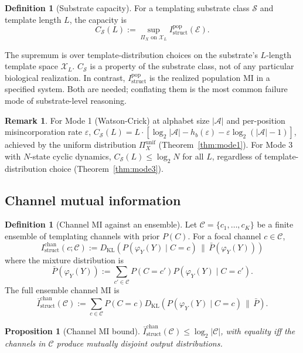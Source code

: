 \documentclass[11pt]{article}
\theoremstyle{plain}
\newtheorem{proposition}[theorem]{Proposition}
\theoremstyle{definition}
\newtheorem{definition}[theorem]{Definition}
\newtheorem{remark}[theorem]{Remark}
\newcommand{\Istructpop}{I_{\mathrm{struct}}^{\mathrm{pop}}}
\newcommand{\Istructchan}{I_{\mathrm{struct}}^{\mathrm{chan}}}
\newcommand{\Csub}{C_{\mathcal{S}}}
\newcommand{\Hbin}{h_b}
\newcommand{\descY}{\varphi_Y}
\newcommand{\KL}[2]{D_{\mathrm{KL}}\!\left(#1 \,\|\, #2\right)}
\begin{document}
\begin{definition}[Substrate capacity]
\label{def:capacity}
For a templating substrate class $\mathcal{S}$ and template length $L$, the capacity is
\[
\Csub(L) := \sup_{\Pi_X \text{ on } \mathcal{X}_L} \Istructpop(\mathcal{E}).
\]
\end{definition}

The supremum is over template-distribution choices on the substrate's $L$-length template space $\mathcal{X}_L$. $\Csub$ is a property of the substrate class, not of any particular biological realization. In contrast, $\Istructpop$ is the realized population MI in a specified system. Both are needed; conflating them is the most common failure mode of substrate-level reasoning.

\begin{remark}
For Mode 1 (Watson-Crick) at alphabet size $|\mathcal{A}|$ and per-position misincorporation rate $\varepsilon$, $\Csub(L) = L \cdot \left[ \log_2 |\mathcal{A}| - \Hbin(\varepsilon) - \varepsilon \log_2 (|\mathcal{A}| - 1) \right]$, achieved by the uniform distribution $\Pi_X^{\mathrm{unif}}$ (Theorem~\ref{thm:mode1}). For Mode 3 with $N$-state cyclic dynamics, $\Csub(L) \le \log_2 N$ for all $L$, regardless of template-distribution choice (Theorem~\ref{thm:mode3}).
\end{remark}

\subsection{Channel mutual information}

\begin{definition}[Channel MI against an ensemble]
Let $\mathcal{C} = \{c_1, \ldots, c_K\}$ be a finite ensemble of templating channels with prior $P(C)$. For a focal channel $c \in \mathcal{C}$,
\[
\Istructchan(c; \mathcal{C}) := \KL{P(\descY(Y) \mid C = c)}{\bar{P}(\descY(Y))}
\]
where the mixture distribution is
\[
\bar{P}(\descY(Y)) := \sum_{c' \in \mathcal{C}} P(C = c') P(\descY(Y) \mid C = c').
\]
The full ensemble channel MI is
\[
\bar{I}_{\mathrm{struct}}^{\mathrm{chan}}(\mathcal{C}) := \sum_{c \in \mathcal{C}} P(C = c) \KL{P(\descY(Y) \mid C = c)}{\bar{P}}.
\]
\end{definition}

\begin{proposition}[Channel MI bound]
\label{prop:chan_bound}
$\bar{I}_{\mathrm{struct}}^{\mathrm{chan}}(\mathcal{C}) \le \log_2 |\mathcal{C}|$, with equality iff the channels in $\mathcal{C}$ produce mutually disjoint output distributions.
\end{proposition}
\end{document}
